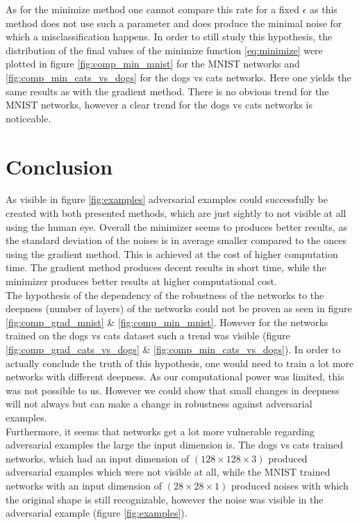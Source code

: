 \documentclass[%
 reprint,
 amsmath,amssymb,
 aps,
]{revtex4-1}
\begin{document}
As for the minimize method one cannot compare this rate for a fixed $\epsilon$ as this method does not use such a parameter and does produce the minimal noise for which a misclassification happens. In order to still study this hypothesis, the distribution of the final values of the minimize function \eqref{eq:minimize} were plotted in figure \ref{fig:comp_min_mnist} for the MNIST networks and \ref{fig:comp_min_cats_vs_dogs} for the dogs vs cats networks. Here one yields the same results as with the gradient method. There is no obvious trend for the MNIST networks, however a clear trend for the dogs vs cats networks is noticeable.\\

\section{Conclusion}

As visible in figure \ref{fig:examples} adversarial examples could successfully be created with both presented methods, which are just sightly to not visible at all using the human eye. Overall the minimizer seems to produces better results, as the standard deviation of the noises is in average smaller compared to the onces using the gradient method. This is achieved at the cost of higher computation time. The gradient method produces decent results in short time, while the minimizer produces better results at higher computational cost. \\
The hypothesis of the dependency of the robustness of the networks to the deepness (number of layers) of the networks could not be proven as seen in figure \ref{fig:comp_grad_mnist} \& \ref{fig:comp_min_mnist}. However for the networks trained on the dogs vs cats dataset such a trend was visible (figure \ref{fig:comp_grad_cats_vs_dogs} \& \ref{fig:comp_min_cats_vs_dogs}). In order to actually conclude the truth of this hypothesis, one would need to train a lot more networks with different deepness. As our computational power was limited, this was not possible to us. However we could show that small changes in deepness will not always but can make a change in robustness against adversarial examples.\\
Furthermore, it seems that networks get a lot more vulnerable regarding adversarial examples the large the input dimension is. The dogs vs cats trained networks, which had an input dimension of $(128 \times 128 \times 3)$ produced adversarial examples which were not visible at all, while the MNIST trained networks with an input dimension of $(28 \times 28 \times 1)$ produced noises with which the original shape is still recognizable, however the noise was visible in the adversarial example (figure \ref{fig:examples}).\\
\end{document}
